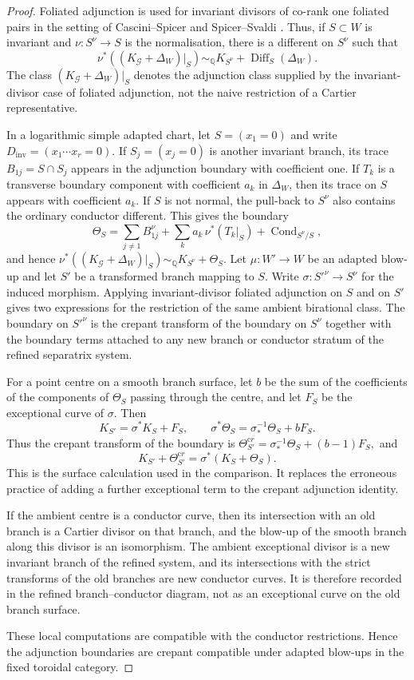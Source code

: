 \documentclass[11pt]{amsart}
\numberwithin{equation}{section}
\theoremstyle{plain}
\theoremstyle{definition}
\newcommand{\Diff}{\operatorname{Diff}}
\newcommand{\Dinv}{D_{\mathrm{inv}}}
\newcommand{\bQ}{\mathbb Q}
\newcommand{\cG}{\mathcal G}
\begin{document}
\begin{proof}
Foliated adjunction is used for invariant divisors of co-rank one foliated pairs in the setting of Cascini--Spicer and Spicer--Svaldi \cite{CSAdj,SS}.  Thus, if $S\subset W$ is invariant and $\nu:S^\nu\to S$ is the normalisation, there is a different on $S^\nu$ such that
\[
\nu^*((K_\cG+\Delta_W)|_S)\sim_\bQ K_{S^\nu}+\Diff_S(\Delta_W).
\]
The class $(K_\cG+\Delta_W)|_S$ denotes the adjunction class supplied by the invariant-divisor case of foliated adjunction, not the naive restriction of a Cartier representative.

In a logarithmic simple adapted chart, let $S=(x_1=0)$ and write $\Dinv=(x_1\cdots x_r=0)$.  If $S_j=(x_j=0)$ is another invariant branch, its trace $B_{1j}=S\cap S_j$ appears in the adjunction boundary with coefficient one.  If $T_k$ is a transverse boundary component with coefficient $a_k$ in $\Delta_W$, then its trace on $S$ appears with coefficient $a_k$.  If $S$ is not normal, the pull-back to $S^\nu$ also contains the ordinary conductor different.  This gives the boundary
\[
\Theta_S=
\sum_{j\ne 1}B_{1j}^\nu+
\sum_k a_k\,\nu^*(T_k|_S)+
\operatorname{Cond}_{S^\nu/S},
\]
and hence
 $
\nu^*((K_\cG+\Delta_W)|_S)\sim_\bQ K_{S^\nu}+\Theta_S.
$
Let $\mu:W'\to W$ be an adapted blow-up and let $S'$ be a transformed branch mapping to $S$.  Write $\sigma:S'^\nu\to S^\nu$ for the induced morphism.  Applying invariant-divisor foliated adjunction on $S$ and on $S'$ gives two expressions for the restriction of the same ambient birational class.  The boundary on $S'^\nu$ is the crepant transform of the boundary on $S^\nu$ together with the boundary terms attached to any new branch or conductor stratum of the refined separatrix system.

For a point centre on a smooth branch surface, let $b$ be the sum of the coefficients of the components of $\Theta_S$ passing through the centre, and let $F_S$ be the exceptional curve of $\sigma$.  Then
\[
K_{S'}=\sigma^*K_S+F_S,
\qquad
\sigma^*\Theta_S=\sigma^{-1}_*\Theta_S+bF_S.
\]
Thus the crepant transform of the boundary is
$
\Theta_{S'}^{\mathrm cr}=\sigma^{-1}_*\Theta_S+(b-1)F_S,
$
and
\[
K_{S'}+\Theta_{S'}^{\mathrm cr}=\sigma^*(K_S+\Theta_S).
\]
This is the surface calculation used in the comparison.  It replaces the erroneous practice of adding a further exceptional term to the crepant adjunction identity.

If the ambient centre is a conductor curve, then its intersection with an old branch is a Cartier divisor on that branch, and the blow-up of the smooth branch along this divisor is an isomorphism.  The ambient exceptional divisor is a new invariant branch of the refined system, and its intersections with the strict transforms of the old branches are new conductor curves.  It is therefore recorded in the refined branch--conductor diagram, not as an exceptional curve on the old branch surface.

These local computations are compatible with the conductor restrictions.  Hence the adjunction boundaries are crepant compatible under adapted blow-ups in the fixed toroidal category.
\end{proof}
\end{document}
